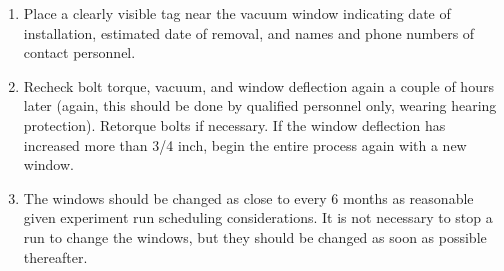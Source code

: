 \begin{enumerate}
\item{Place a clearly visible tag near the vacuum window indicating
date of installation, estimated date of removal, and names and phone
numbers of contact personnel.}

\item{Recheck bolt torque, vacuum, and window deflection
again a couple of hours later (again, this should be done by
qualified personnel only, wearing hearing
protection). Retorque bolts if necessary.
If the window deflection has increased more than 3/4 inch, begin the entire
process again with a new window.}

\item{The windows should be changed as close to every 6 months as
reasonable given experiment run scheduling considerations. It is not
necessary to stop a run to change the windows, but they should be changed
as soon as possible thereafter.}

\end{enumerate}


